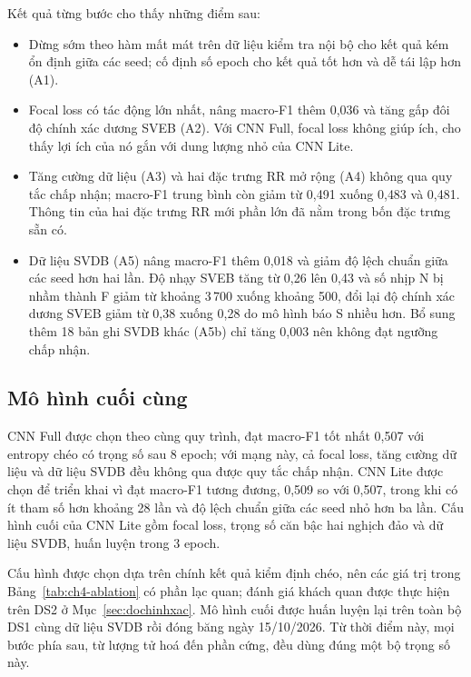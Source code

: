 Kết quả từng bước cho thấy những điểm sau:
\begin{itemize}
  \item Dừng sớm theo hàm mất mát trên dữ liệu kiểm tra nội bộ cho kết quả kém ổn định giữa các seed; cố định số epoch cho kết quả tốt hơn và dễ tái lập hơn (A1).
  \item Focal loss có tác động lớn nhất, nâng macro-F1 thêm 0{,}036 và tăng gấp đôi độ chính xác dương SVEB (A2).
  Với CNN Full, focal loss không giúp ích, cho thấy lợi ích của nó gắn với dung lượng nhỏ của CNN Lite.
  \item Tăng cường dữ liệu (A3) và hai đặc trưng RR mở rộng (A4) không qua quy tắc chấp nhận; macro-F1 trung bình còn giảm từ 0{,}491 xuống 0{,}483 và 0{,}481.
  Thông tin của hai đặc trưng RR mới phần lớn đã nằm trong bốn đặc trưng sẵn có.
  \item Dữ liệu SVDB (A5) nâng macro-F1 thêm 0{,}018 và giảm độ lệch chuẩn giữa các seed hơn hai lần.
  Độ nhạy SVEB tăng từ 0{,}26 lên 0{,}43 và số nhịp N bị nhầm thành F giảm từ khoảng 3\,700 xuống khoảng 500, đổi lại độ chính xác dương SVEB giảm từ 0{,}38 xuống 0{,}28 do mô hình báo S nhiều hơn.
  Bổ sung thêm 18 bản ghi SVDB khác (A5b) chỉ tăng 0{,}003 nên không đạt ngưỡng chấp nhận.
\end{itemize}

\subsection{Mô hình cuối cùng}

CNN Full được chọn theo cùng quy trình, đạt macro-F1 tốt nhất 0{,}507 với entropy chéo có trọng số sau 8 epoch; với mạng này, cả focal loss, tăng cường dữ liệu và dữ liệu SVDB đều không qua được quy tắc chấp nhận.
CNN Lite được chọn để triển khai vì đạt macro-F1 tương đương, 0{,}509 so với 0{,}507, trong khi có ít tham số hơn khoảng 28 lần và độ lệch chuẩn giữa các seed nhỏ hơn ba lần.
Cấu hình cuối của CNN Lite gồm focal loss, trọng số căn bậc hai nghịch đảo và dữ liệu SVDB, huấn luyện trong 3 epoch.

Cấu hình được chọn dựa trên chính kết quả kiểm định chéo, nên các giá trị trong Bảng~\ref{tab:ch4-ablation} có phần lạc quan; đánh giá khách quan được thực hiện trên DS2 ở Mục~\ref{sec:dochinhxac}.
Mô hình cuối được huấn luyện lại trên toàn bộ DS1 cùng dữ liệu SVDB rồi đóng băng ngày 15/10/2026.
Từ thời điểm này, mọi bước phía sau, từ lượng tử hoá đến phần cứng, đều dùng đúng một bộ trọng số này.
